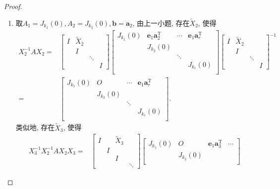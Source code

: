 \documentclass{ctexart}
\newcommand\bs[1]{\boldsymbol{ #1}}
\def\zero{O}
\def\wtd{\widetilde}
\DeclareMathOperator{\T}{T}
\begin{document}
\begin{proof}
\begin{enumerate}
			\item 取$A_1=J_{k_1}(0),A_2=J_{k_2}(0),\bs b=\bs a_2$, 由上一小题, 
				存在$\wtd X_2$, 使得
                \begin{align*}
                    X_2^{-1}AX_2=&\begin{bmatrix}
                        I & \wtd X_2 \\ & I \\ & &\ddots\\&&&I 
                    \end{bmatrix}
                    \begin{bmatrix}
            J_{k_1}(0) & \bs e_1\bs a_2^{\T} & \cdots & \bs  e_1\bs a_r^{\T}\\
            &J_{k_2}(0) \\
            && \ddots \\
            &&&J_{k_r}(0)\\
                    \end{bmatrix}\begin{bmatrix}
                        I & \wtd X_2 \\ & I \\ & &\ddots\\&&&I 
                    \end{bmatrix}^{-1}\\
                    =&\begin{bmatrix}
            J_{k_1}(0) & \zero & \cdots & \bs  e_1\bs a_r^{\T}\\
            &J_{k_2}(0) \\
            && \ddots \\
            &&&J_{k_r}(0)\\
                    \end{bmatrix}
                    .
                \end{align*}
				类似地, 
				存在$\wtd X_3$, 使得
                \begin{align*}
                    X_3^{-1}X_2^{-1}AX_2X_3=&\begin{bmatrix}
                        I & &\wtd X_3 \\ & I \\ & &I\\&&&\ddots 
                    \end{bmatrix}
                    \begin{bmatrix}
                        J_{k_1}(0) & \zero & \bs  e_1\bs a_3^{\T}&\cdots \\
            &J_{k_2}(0) \\

\end{bmatrix}
\end{align*}
\end{enumerate}
\end{proof}
\end{document}
